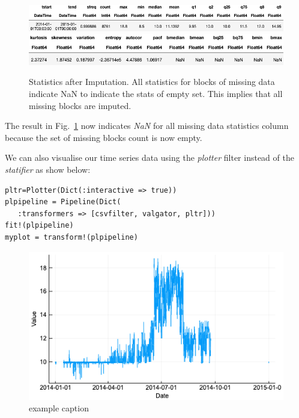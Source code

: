 \documentclass{juliacon}
\begin{document}
\begin{figure}[htbp]
   \centering
   \includegraphics[width=\columnwidth]{imputed1.png} %
   \vskip 2pt
      \includegraphics[width=\columnwidth]{imputed2.png} %
   \caption{Statistics after Imputation. All statistics for blocks of missing data indicate NaN to indicate the stats of empty set. This implies that all missing blocks are imputed.}
   \label{fig:imputation}
\end{figure}

The result in Fig.~\ref{fig:imputation} now indicates \emph{NaN} for all missing data statistics column because the set 
of missing blocks count is now empty.

\vskip 3pt

We can also visualise our time series data using the \emph{plotter} filter instead of the \emph{statifier} as show below:

\begin{lstlisting}
pltr=Plotter(Dict(:interactive => true))
plpipeline = Pipeline(Dict(
   :transformers => [csvfilter, valgator, pltr]))
fit!(plpipeline)
myplot = transform!(plpipeline)
\end{lstlisting}

\begin{figure}[htbp]
   \centering
   \includegraphics[width=\columnwidth]{mplot.png} %
   \caption{example caption}
   \label{fig:example}
\end{figure}
\end{document}
